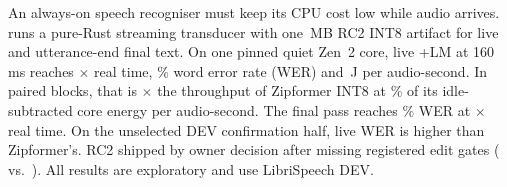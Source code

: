 An always-on speech recogniser must keep its CPU cost low while audio arrives.
\ultra{} runs a pure-Rust streaming transducer with one \ColdHeadModel\,MB RC2 INT8 artifact for live and
utterance-end final text. On one pinned quiet Zen~2 core, live +LM at 160\,ms reaches
\ColdLiveSpeed$\times$ real time, \ColdLiveWer\% word error rate (WER) and
\ColdLiveWatts\,J per audio-second. In paired blocks, that is \VsSpeedXOne$\times$ the throughput
of Zipformer INT8 at \VsEnergyPctOne\% of its idle-subtracted core energy per audio-second.
The final pass reaches \ColdHeadWer\% WER at \ColdHeadSpeed$\times$ real time.
On the unselected DEV confirmation half, live WER is \CandLiveLmCDelta\pp higher than Zipformer's.
RC2 shipped by owner decision after missing registered edit gates
(\CandFinalFullEdits{} vs.\ \CandGateFinalFull).
All results are exploratory and use LibriSpeech DEV.
